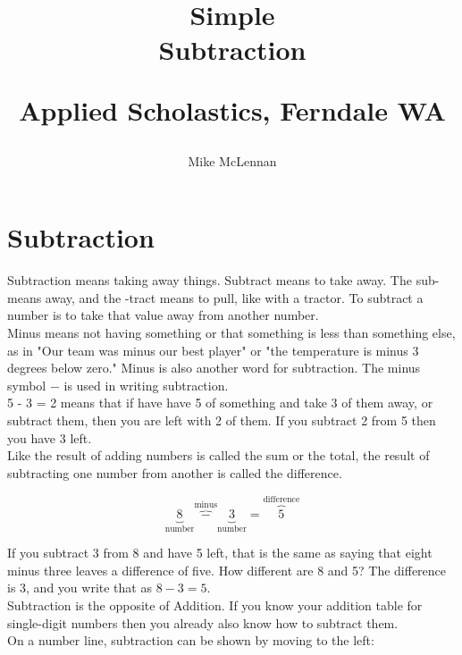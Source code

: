 \documentclass{article}
\author{Mike McLennan}
\date{}
\title{Simple\\Subtraction\\
\vspace{28pt}
\begin{normalsize}Applied Scholastics, Ferndale WA \end{normalsize}}
\begin{document}
\maketitle
\pagebreak
\tableofcontents
\pagebreak

\section{Subtraction}
Subtraction means taking away things. Subtract means to take away. The sub- means away, and the -tract means to pull, like with a tractor. To subtract a number is to take that value away from another number.\\

Minus means not having something or that something is less than something else, as in "Our team was minus our best player" or "the temperature is minus 3 degrees below zero." Minus is also another word for subtraction. The minus symbol $-$ is used in writing subtraction.\\

5 - 3 = 2 means that if have have 5 of something  and take 3 of them away, or subtract them, then you are left with 2 of them.  If you subtract 2 from 5 then you have 3 left.\\

Like the result of adding numbers is called the sum or the total, the result of subtracting one number from another is called the difference.

$$\underbrace{8}_{\textrm{number}} \overbrace{-}^{\textrm{minus}} \underbrace{3}_{\textrm{number}} = \overbrace{5}^{\textrm{difference}}$$
\vspace{28pt}

\pagebreak

If you subtract 3 from 8 and have 5 left, that is the same as saying that eight minus three leaves a difference of five. How different are 8 and 5? The difference is 3, and you write that as $8 - 3 = 5$.\\

Subtraction is the opposite of Addition. If you know your addition table for single-digit numbers then you already also know how to subtract them.\\

On a number line, subtraction can be shown by moving to the left:\\

\end{document}
